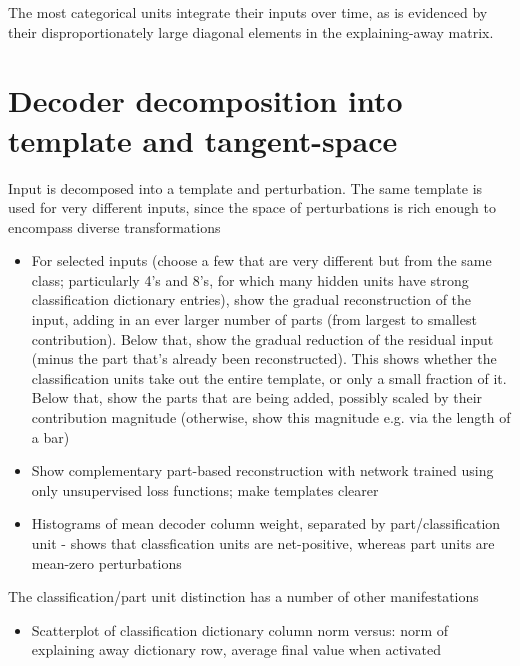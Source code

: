 \documentclass{article} %
\begin{document}
The most categorical units integrate their inputs over time, as is evidenced by their disproportionately large diagonal elements in the explaining-away matrix.



\section{Decoder decomposition into template and tangent-space}

Input is decomposed into a template and perturbation.  The same template is used for very different inputs, since the space of perturbations is rich enough to encompass diverse transformations
\begin{itemize}
\item For selected inputs (choose a few that are very different but from the same class; particularly 4's and 8's, for which many hidden units have strong classification dictionary entries), show the gradual reconstruction of the input, adding in an ever larger number of parts (from largest to smallest contribution).  Below that, show the gradual reduction of the residual input (minus the part that's already been reconstructed).  This shows whether the classification units take out the entire template, or only a small fraction of it.  Below that, show the parts that are being added, possibly scaled by their contribution magnitude (otherwise, show this magnitude e.g. via the length of a bar)
\item Show complementary part-based reconstruction with network trained using only unsupervised loss functions; make templates clearer
\item Histograms of mean decoder column weight, separated by part/classification unit - shows that classfication units are net-positive, whereas part units are mean-zero perturbations
\end{itemize}

The classification/part unit distinction has a number of other manifestations
\begin{itemize}
\item Scatterplot of classification dictionary column norm versus: norm of explaining away dictionary row, average final value when activated
\end{itemize}
\end{document}

